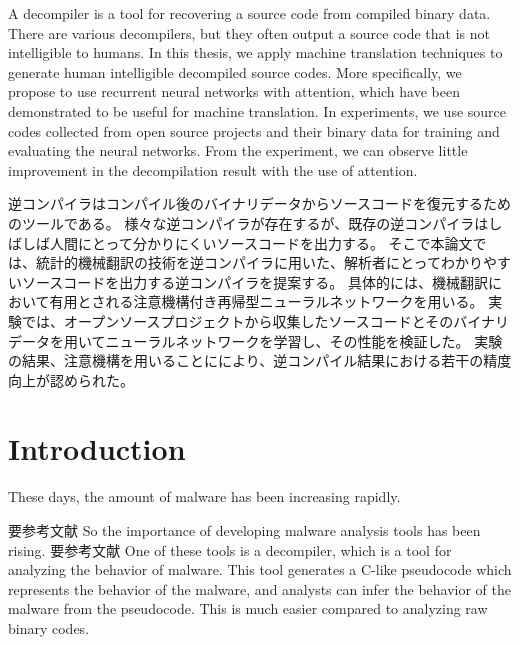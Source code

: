 \documentclass[senior,final,11pt]{iscs-thesis}
\date{December 11, 2018}
\begin{document}
\begin{eabstract}
A decompiler is a tool for recovering a source code from compiled binary data.
There are various decompilers, but they often output a source code that is not intelligible to humans. 
In this thesis, we apply machine translation techniques to generate human intelligible decompiled source codes. 
More specifically, we propose to use recurrent neural networks with attention, 
which have been demonstrated to be useful for machine translation. 
In experiments, we use source codes collected from open source projects and their binary data for training and evaluating the neural networks.
From the experiment, we can observe little improvement in the decompilation result with the use of attention.

\end{eabstract}
\begin{jabstract}
逆コンパイラはコンパイル後のバイナリデータからソースコードを復元するためのツールである。
様々な逆コンパイラが存在するが、既存の逆コンパイラはしばしば人間にとって分かりにくいソースコードを出力する。
そこで本論文では、統計的機械翻訳の技術を逆コンパイラに用いた、解析者にとってわかりやすいソースコードを出力する逆コンパイラを提案する。
具体的には、機械翻訳において有用とされる注意機構付き再帰型ニューラルネットワークを用いる。
実験では、オープンソースプロジェクトから収集したソースコードとそのバイナリデータを用いてニューラルネットワークを学習し、その性能を検証した。
実験の結果、注意機構を用いることににより、逆コンパイル結果における若干の精度向上が認められた。
\end{jabstract}

\maketitle

\chapter{Introduction}

These days, the amount of malware has been increasing rapidly.

要参考文献
So the importance of developing malware analysis tools has been rising.
要参考文献
One of these tools is a decompiler, which is a tool for analyzing the behavior of malware. 
This tool generates a C-like pseudocode which represents the behavior of the malware, and analysts can infer the behavior of the malware from the pseudocode.
This is much easier compared to analyzing raw binary codes.
\end{document}
